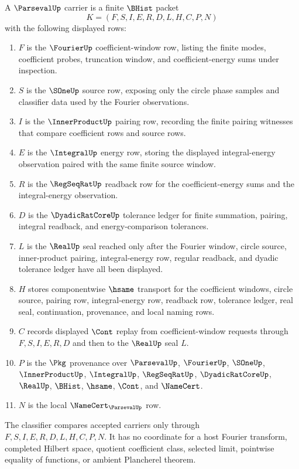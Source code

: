 \begin{definition}\label{def:parseval-carrier}
A $\ParsevalUp$ carrier is a finite $\BHist$ packet
$$
K=(F,S,I,E,R,D,L,H,C,P,N)
$$
with the following displayed rows:
\begin{enumerate}
\item $F$ is the $\FourierUp$ coefficient-window row, listing the finite modes, coefficient probes, truncation window, and coefficient-energy sums under inspection.
\item $S$ is the $\SOneUp$ source row, exposing only the circle phase samples and classifier data used by the Fourier observations.
\item $I$ is the $\InnerProductUp$ pairing row, recording the finite pairing witnesses that compare coefficient rows and source rows.
\item $E$ is the $\IntegralUp$ energy row, storing the displayed integral-energy observation paired with the same finite source window.
\item $R$ is the $\RegSeqRatUp$ readback row for the coefficient-energy sums and the integral-energy observation.
\item $D$ is the $\DyadicRatCoreUp$ tolerance ledger for finite summation, pairing, integral readback, and energy-comparison tolerances.
\item $L$ is the $\RealUp$ seal reached only after the Fourier window, circle source, inner-product pairing, integral-energy row, regular readback, and dyadic tolerance ledger have all been displayed.
\item $H$ stores componentwise $\hsame$ transport for the coefficient windows, circle source, pairing row, integral-energy row, readback row, tolerance ledger, real seal, continuation, provenance, and local naming rows.
\item $C$ records displayed $\Cont$ replay from coefficient-window requests through $F,S,I,E,R,D$ and then to the $\RealUp$ seal $L$.
\item $P$ is the $\Pkg$ provenance over $\ParsevalUp$, $\FourierUp$, $\SOneUp$, $\InnerProductUp$, $\IntegralUp$, $\RegSeqRatUp$, $\DyadicRatCoreUp$, $\RealUp$, $\BHist$, $\hsame$, $\Cont$, and $\NameCert$.
\item $N$ is the local $\NameCert_{\ParsevalUp}$ row.
\end{enumerate}
The classifier compares accepted carriers only through $F,S,I,E,R,D,L,H,C,P,N$. It has no coordinate for a host Fourier transform, completed Hilbert space, quotient coefficient class, selected limit, pointwise equality of functions, or ambient Plancherel theorem.
\end{definition}

